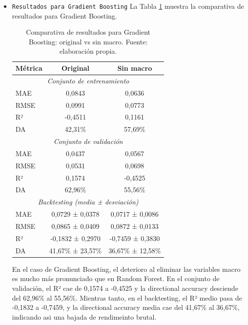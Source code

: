 \begin{enumerate}
\begin{itemize}
        En cuanto a las gráficas de predicción versus valor real, ambas configuraciones presentan un aspecto similar, con la diferencia de que las predicciones del modelo sin macro tienden a estar más cerca de la media histórica, lo que refleja una menor capacidad para capturar los movimientos extremos del mercado.

        \item \texttt{Resultados para Gradient Boosting}
        La Tabla \ref{tab:experimento_gb} muestra la comparativa de resultados para Gradient Boosting.

        \begin{table}[H]
        \centering
        \begin{tabular}{|l|c|c|}
        \hline
        \textbf{Métrica} & \textbf{Original} & \textbf{Sin macro} \\
        \hline
        \multicolumn{3}{|c|}{\textit{Conjunto de entrenamiento}} \\
        \hline
        MAE & 0,0843 & 0,0636 \\
        RMSE & 0,0991 & 0,0773 \\
        R² & -0,4511 & 0,1161 \\
        DA & 42,31\% & 57,69\% \\
        \hline
        \multicolumn{3}{|c|}{\textit{Conjunto de validación}} \\
        \hline
        MAE & 0,0437 & 0,0567 \\
        RMSE & 0,0531 & 0,0698 \\
        R² & 0,1574 & -0,4525 \\
        DA & 62,96\% & 55,56\% \\
        \hline
        \multicolumn{3}{|c|}{\textit{Backtesting (media ± desviación)}} \\
        \hline
        MAE & 0,0729 ± 0,0378 & 0,0717 ± 0,0086 \\
        RMSE & 0,0865 ± 0,0409 & 0,0872 ± 0,0133 \\
        R² & -0,1832 ± 0,2970 & -0,7459 ± 0,3830 \\
        DA & 41,67\% ± 23,57\% & 36,67\% ± 12,58\% \\
        \hline
        \end{tabular}
        \label{tab:experimento_gb}
        \caption{Comparativa de resultados para Gradient Boosting: original vs sin macro. Fuente: elaboración propia.}
        \end{table}

        En el caso de Gradient Boosting, el deterioro al eliminar las variables macro es mucho más pronunciado que en Random Forest. En el conjunto de validación, el R² cae de 0,1574 a -0,4525 y la directional accuracy desciende del 62,96\% al 55,56\%. Mientras tanto, en el backtesting, el R² medio pasa de -0,1832 a -0,7459, y la directional accuracy media cae del 41,67\% al 36,67\%, indicando asi una bajada de rendimeinto brutal.


\end{itemize}
\end{enumerate}
